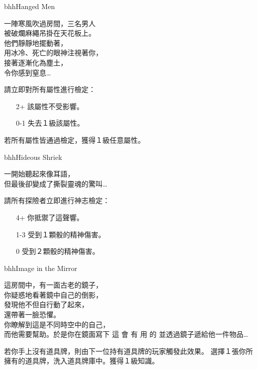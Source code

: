 \linebreak[0]%
\begin{EventCard}{bhh}{Hanged Men}
  \begin{CardStory}
    一陣寒風吹過房間，三名男人\\
    被破爛麻繩吊掛在天花板上。\\
    他們靜靜地擺動著，\\
    用冰冷、死亡的眼神注視著你，\\
    接著逐漸化為塵土，\\
    令你感到窒息…
  \end{CardStory}
  請立即對所有屬性進行檢定：
  \begin{itemize}
    \item[2+] 該屬性不受影響。
    \item[0-1] 失去１級該屬性。
  \end{itemize}
  若所有屬性皆通過檢定，獲得１級任意屬性。\smallbreak
\end{EventCard}%
\linebreak[0]%
\begin{EventCard}{bhh}{Hideous Shriek}
  \begin{CardStory}
    一開始聽起來像耳語，\\
    但最後卻變成了撕裂靈魂的驚叫…
  \end{CardStory}
  請所有探險者立即進行神志檢定：
  \begin{itemize}
    \item[4+] 你抵禦了這聲響。
    \item[1-3] 受到１顆骰的精神傷害。
    \item[0] 受到２顆骰的精神傷害。
  \end{itemize}
\end{EventCard}%
\linebreak[0]%
\begin{EventCard}{bhh}{Image in the Mirror}
  \begin{CardStory}
    這房間中，有一面古老的鏡子，\\
    你疑惑地看著鏡中自己的倒影，\\
    發現他不但自行動了起來，\\
    還帶著一臉恐懼。\\
    你瞭解到這是不同時空中的自己，\\
    而他需要幫助。於是你在鏡面寫下\smallbreak
    { \FontScript 這 \enskip 會 \enskip 有 \enskip 用 \enskip 的 }\smallbreak
    並透過鏡子遞給他一件物品…
\end{CardStory}
  若你手上沒有道具牌，則由下一位持有道具牌的玩家觸發此效果。\smallbreak
  選擇１張你所擁有的道具牌，洗入道具牌庫中。獲得１級知識。\smallbreak
\end{EventCard}%
